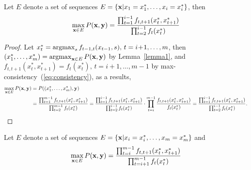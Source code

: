 \begin{lemma}
\label{lemma3}
Let $E$ denote a set of sequences $E = \{\mathbf{x} |x_1 = x_1^*, \dots, x_i = x_i^*\}$, then
\begin{equation*}
\max_{\mathbf{x} \in E} P(\mathbf{x},\mathbf{y}) = \frac{\prod_{t=1}^{i-1} f_{t,t+1}(x_t^*, x_{t+1}^*)} {\prod_{t=2}^{i-1} f_t(x_t^*)}
\end{equation*}
\end{lemma}

\begin{proof}
Let $x_t^* = \operatorname*{argmax}_{s} f_{t-1, t}(x_{t-1}, s), \, t = i\!+\!1,\dots,m$, 
then $(x_1^*,\dots,x_m^*) = \operatorname*{argmax}_{\mathbf{x} \in E} P(\mathbf{x},\mathbf{y})$ by Lemma~\ref{lemma1},
and $f_{t,t+1}(x_t^*, x_{t+1}^*) = f_{t}(x_t^*), \, t = i\!+\!1,\dots,m\!-\!1$ by max-consistency~(\ref{eq:consistency}),
as a results,
\begin{align*}
\max_{\x \in E} P(\x,\y) &= P((x_1^*,\dots,x_m^*), \y) \\
&= \frac{\prod_{t=1}^{m-1} f_{t,t+1}(x_t^*, x_{t+1}^*)} {\prod_{t=2}^{m-1} f_t(x_t^*)} %
= \frac{\prod_{t=1}^{i-1} f_{t,t+1}(x_t^*, x_{t+1}^*)} {\prod_{t=2}^{i-1} f_t(x_t^*)} \cdot
  \prod_{t=i}^{m-1} \frac{f_{t,t+1}(x_t^*, x_{t+1}^*)} {f_t(x_t^*)}                   %
= \frac{\prod_{t=1}^{i-1} f_{t,t+1}(x_t^*, x_{t+1}^*)} {\prod_{t=2}^{i-1} f_t(x_t^*)}.
\end{align*}
\end{proof}

\begin{lemma}
\label{lemma4}
Let $E$ denote a set of sequences $E = \{\mathbf{x} |x_i = x_i^*, \dots, x_m = x_m^*\}$ and
\begin{equation*}
\max_{\mathbf{x} \in E} P(\mathbf{x},\mathbf{y}) = \frac{\prod_{t=i}^{m-1} f_{t,t+1}(x_t^*, x_{t+1}^*)} {\prod_{t=i+1}^{m-1} f_t(x_t^*)}
\end{equation*}
\end{lemma}

